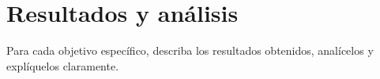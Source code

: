 \chapter{Resultados y análisis} %
\label{sec:resultados} %

Para cada objetivo específico, describa los resultados obtenidos, analícelos y explíquelos claramente.
